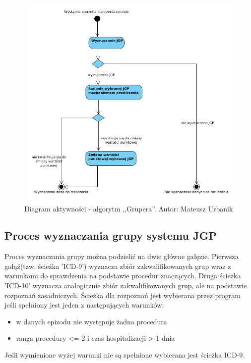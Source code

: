 \begin{figure}[!ht]
\centering
\includegraphics[scale=0.4]{images/activity-gruper}
\caption[Diagram aktywności]{Diagram aktywności - algorytm ,,Grupera''. Autor: Mateusz Urbanik}
\label{img:diagram_activity_gruper}
\end{figure}

\newpage
\subsection{Proces wyznaczania grupy systemu JGP}
\label{sec:procesWyznaczaniaGrupySystemuJGP}
Proces wyznaczania grupy można podzielić na dwie główne gałęzie. Pierwsza gałąź(tzw. ścieżka 'ICD-9') wyznacza zbiór zakwalifikowanych grup wraz z warunkami do sprawdzenia na podstawie procedur znaczących. Druga ścieżka 'ICD-10' wyznacza analogicznie zbiór zakwalifikowanych grup, ale na podstawie rozpoznań zasadniczych. Ścieżka dla rozpoznań jest wybierana przez program jeśli spełniony jest jeden z następujących warunków:
\begin{itemize}\itemsep2pt
\item w danych epizodu nie występuje żadna procedura
\item ranga procedury <= 2 i czas hospitalizacji > 1 dnia
\end{itemize}
Jeśli wymienione wyżej warunki nie są spełnione wybierana jest ścieżka ICD-9\cite{algorytm_grupera}.

